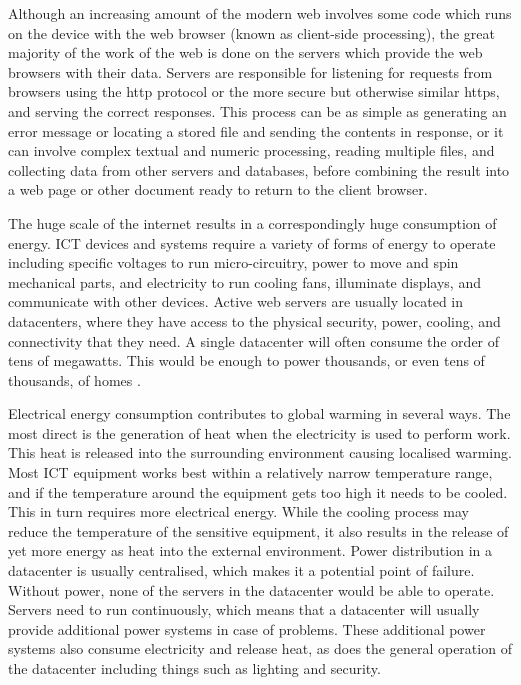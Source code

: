 Although an increasing amount of the modern web involves some code which runs on the device with the web browser (known as \gls{client-side processing}), the great majority of the work of the web is done on the servers which provide the web browsers with their data. Servers are responsible for listening for requests from browsers using the \gls{http} protocol \citep{rfc2616} or the more secure but otherwise similar \gls{https}, and serving the correct responses. This process can be as simple as generating an error message or locating a stored file and sending the contents in response, or it can involve complex textual and numeric processing, reading multiple files, and collecting data from other servers and databases, before combining the result into a web page or other document ready to return to the client browser.

The huge scale of the internet results in a correspondingly huge consumption of energy. ICT devices and systems require a variety of forms of energy to operate including specific voltages to run micro-circuitry, power to move and spin mechanical parts, and electricity to run cooling fans, illuminate displays, and communicate with other devices. Active web servers are usually located in \gls{datacenter}s, where they have access to the physical security, power, cooling, and connectivity that they need. A single datacenter will often consume the order of tens of megawatts. This would be enough to power thousands, or even tens of thousands, of homes \citep{Law2022}.

Electrical energy consumption contributes to \gls{global warming} in several ways. The most direct is the generation of heat when the electricity is used to perform work. This heat is released into the surrounding environment causing localised warming. Most ICT equipment works best within a relatively narrow temperature range, and if the temperature around the equipment gets too high it needs to be cooled. This in turn requires more electrical energy. While the cooling process may reduce the temperature of the sensitive equipment, it also results in the release of yet more energy as heat into the external environment. Power distribution in a datacenter is usually centralised, which makes it a potential point of failure. Without power, none of the servers in the datacenter would be able to operate. Servers need to run continuously, which means that a datacenter will usually provide additional power systems in case of problems. These additional power systems also consume electricity and release heat, as does the general operation of the datacenter including things such as lighting and security.

